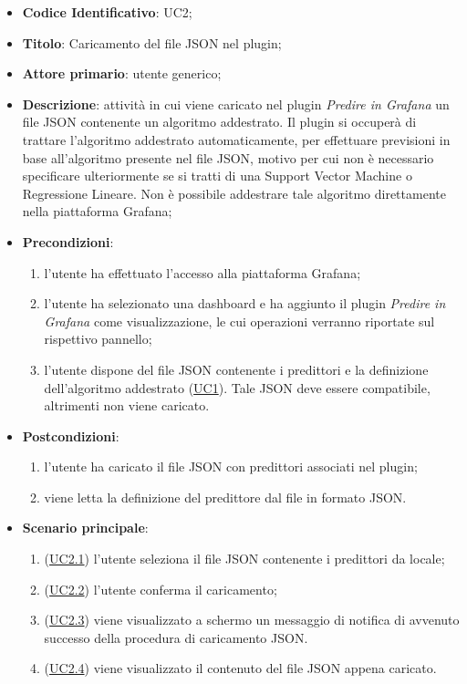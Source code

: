 		
		\begin{itemize}
			\item\textbf{Codice Identificativo}: UC2;
			\item\textbf{Titolo}: Caricamento del file JSON nel plugin;
			\item\textbf{Attore primario}: utente generico;
			\item\textbf{Descrizione}: attività in cui viene caricato nel plugin \textit{Predire in Grafana} un file JSON contenente un algoritmo addestrato. Il plugin si occuperà di trattare l'algoritmo addestrato automaticamente, per effettuare previsioni in base all'algoritmo presente nel file JSON, motivo per cui non è necessario specificare ulteriormente se si tratti di una Support Vector Machine o Regressione Lineare. Non è possibile addestrare tale algoritmo direttamente nella piattaforma Grafana; 
			\item\textbf{Precondizioni}:
				\begin{enumerate}
					\item l'utente ha effettuato l'accesso alla piattaforma Grafana;
					\item l'utente ha selezionato una dashboard e ha aggiunto il plugin \textit{Predire in Grafana} come visualizzazione, le cui operazioni verranno riportate sul rispettivo pannello;
					\item l'utente dispone del file JSON contenente i predittori e la definizione dell'algoritmo addestrato (\hyperref[par:UC1]{UC1}). Tale JSON deve essere compatibile, altrimenti non viene caricato.
				\end{enumerate}
			\item\textbf{Postcondizioni}:
				\begin{enumerate}
					\item l'utente ha caricato il file JSON con predittori associati nel plugin;
					\item viene letta la definizione del predittore dal file in formato JSON.
				\end{enumerate}
			\item\textbf{Scenario principale}:
				\begin{enumerate}
					\item (\hyperref[par:UC2.1]{UC2.1}) l'utente seleziona il file JSON contenente i predittori da locale;
					\item (\hyperref[par:UC2.2]{UC2.2}) l'utente conferma il caricamento;
					\item (\hyperref[par:UC2.3]{UC2.3}) viene visualizzato a schermo un messaggio di notifica di avvenuto successo della procedura di caricamento JSON.
					\item (\hyperref[par:UC2.4]{UC2.4}) viene visualizzato il contenuto del file JSON appena caricato.
				\end{enumerate}
			
		\end{itemize}
		
